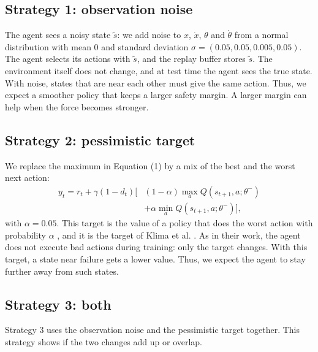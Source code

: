 \documentclass[sigconf]{acmart}
\begin{document}
\subsection{Strategy 1: observation noise}
The agent sees a noisy state $\tilde{s}$: we add noise to $x$, $\dot{x}$, $\theta$ and $\dot{\theta}$ from a normal distribution with mean 0 and standard deviation $\sigma = (0.05, 0.05, 0.005, 0.05)$. The agent selects its actions with $\tilde{s}$, and the replay buffer stores $\tilde{s}$. The environment itself does not change, and at test time the agent sees the true state. With noise, states that are near each other must give the same action. Thus, we expect a smoother policy that keeps a larger safety margin. A larger margin can help when the force becomes stronger.

\subsection{Strategy 2: pessimistic target}
We replace the maximum in Equation (1) by a mix of the best and the worst next action:
\begin{equation}
\begin{split}
y_t = r_t + \gamma (1 - d_t) [ & (1 - \alpha) \max_{a} Q(s_{t+1}, a; \theta^{-}) \\
& + \alpha \min_{a} Q(s_{t+1}, a; \theta^{-}) ],
\end{split}
\end{equation}
with $\alpha = 0.05$. This target is the value of a policy that does the worst action with probability $\alpha$ \cite{tessler2019action}, and it is the target of Klima et al. \cite{klima2019robust}. As in their work, the agent does not execute bad actions during training: only the target changes. With this target, a state near failure gets a lower value. Thus, we expect the agent to stay further away from such states.

\subsection{Strategy 3: both}
Strategy 3 uses the observation noise and the pessimistic target together. This strategy shows if the two changes add up or overlap.
\end{document}
